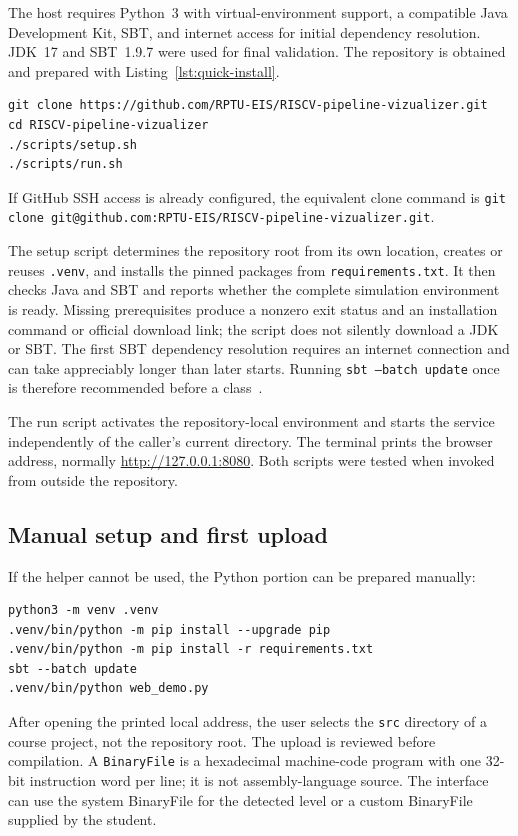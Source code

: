 \documentclass[11pt,a4paper]{article}
\begin{document}
The host requires Python~3 with virtual-environment support, a compatible Java Development Kit, SBT, and internet access for initial dependency resolution. JDK~17 and SBT~1.9.7 were used for final validation. The repository is obtained and prepared with Listing~\ref{lst:quick-install}.

\begin{lstlisting}[style=terminal,caption={Clone, setup, and startup commands.},label={lst:quick-install}]
git clone https://github.com/RPTU-EIS/RISCV-pipeline-vizualizer.git
cd RISCV-pipeline-vizualizer
./scripts/setup.sh
./scripts/run.sh
\end{lstlisting}

If GitHub SSH access is already configured, the equivalent clone command is \texttt{git clone git@github.com:RPTU-EIS/RISCV-pipeline-vizualizer.git}.

The setup script determines the repository root from its own location, creates or reuses \texttt{.venv}, and installs the pinned packages from \texttt{requirements.txt}. It then checks Java and SBT and reports whether the complete simulation environment is ready. Missing prerequisites produce a nonzero exit status and an installation command or official download link; the script does not silently download a JDK or SBT. The first SBT dependency resolution requires an internet connection and can take appreciably longer than later starts. Running \texttt{sbt --batch update} once is therefore recommended before a class~\cite{sbt-docs}.

The run script activates the repository-local environment and starts the service independently of the caller's current directory. The terminal prints the browser address, normally \url{http://127.0.0.1:8080}. Both scripts were tested when invoked from outside the repository.

\subsection{Manual setup and first upload}

If the helper cannot be used, the Python portion can be prepared manually:

\begin{lstlisting}[style=terminal]
python3 -m venv .venv
.venv/bin/python -m pip install --upgrade pip
.venv/bin/python -m pip install -r requirements.txt
sbt --batch update
.venv/bin/python web_demo.py
\end{lstlisting}

After opening the printed local address, the user selects the \texttt{src} directory of a course project, not the repository root. The upload is reviewed before compilation. A \texttt{BinaryFile} is a hexadecimal machine-code program with one 32-bit instruction word per line; it is not assembly-language source. The interface can use the system BinaryFile for the detected level or a custom BinaryFile supplied by the student.
\end{document}
